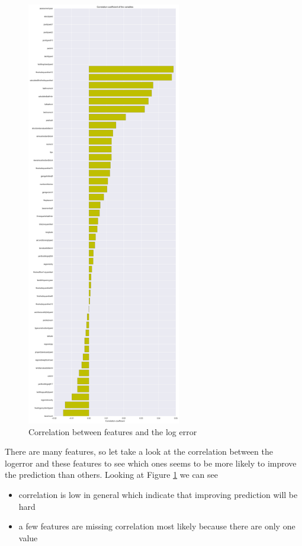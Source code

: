 \documentclass[a4paper]{article}
\begin{document}
\begin{figure}
\centering
\includegraphics[width=0.6\textwidth]{./img/prop-important.png}
\caption{\label{fig:prop-important} Correlation between features and the log error}
\end{figure}
There are many features, so let take a look at the correlation between the logerror and these features to see which ones seems to be more likely to improve the prediction than others. Looking at Figure \ref{fig:prop-important} we can see
\begin{itemize}
    \item correlation is low in general which indicate that improving prediction will be hard
    \item a few features are missing correlation most likely because there are only one value
\end{itemize}
\end{document}
